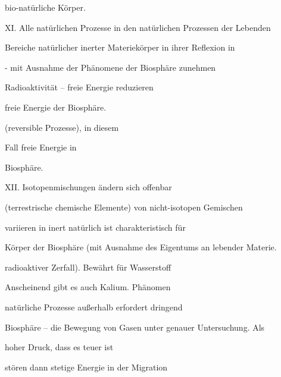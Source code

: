\documentclass[11pt,a4paper]{book}
\begin{document}
bio-natürliche Körper.



 



XI. Alle natürlichen Prozesse in den natürlichen Prozessen der Lebenden



Bereiche natürlicher inerter Materiekörper in ihrer Reflexion in



- mit Ausnahme der Phänomene der Biosphäre zunehmen



Radioaktivität -- freie Energie reduzieren



freie Energie der Biosphäre.



(reversible Prozesse), in diesem



Fall freie Energie in



Biosphäre.



 



XII. Isotopenmischungen ändern sich offenbar



(terrestrische chemische Elemente) von nicht-isotopen Gemischen



variieren in inert natürlich ist charakteristisch für



Körper der Biosphäre (mit Ausnahme des Eigentums an lebender Materie.



radioaktiver Zerfall). Bewährt für Wasserstoff



Anscheinend gibt es auch Kalium. Phänomen



natürliche Prozesse außerhalb erfordert dringend



Biosphäre -- die Bewegung von Gasen unter genauer Untersuchung. Als



hoher Druck, dass es teuer ist



stören dann stetige Energie in der Migration
\end{document}
